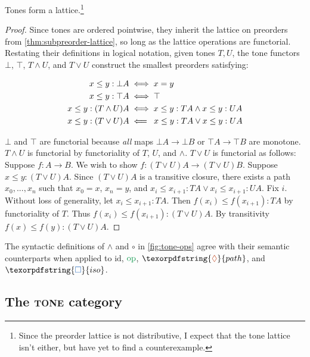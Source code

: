 \documentclass{rntz}
\newcommand{\todo}[1]{{\color{Purple}#1}}
\newcommand{\cat}[1]{\textsc{#1}} %
\newcommand{\Tone}{\cat{tone}}
\newcommand\opcolor{\color{ForestGreen}}
\newcommand\isocolor{\color{NavyBlue}}
\newcommand\pathcolor{\color{Bittersweet}}
\newcommand\id{\ensuremath{\mathrm{id}}}
\newcommand\op{\ensuremath{\mathrm{\opcolor op}}}
\newcommand\iso{\texorpdfstring{\ensuremath{{\isocolor\Box}}}{iso}}
\renewcommand\path{\texorpdfstring{\ensuremath{{\pathcolor\lozenge}}}{path}}
\newcommand\tc{\circ}                      %
\newcommand\tmeet{\wedge}                  %
\begin{document}
\begin{theorem}
  Tones form a lattice.\footnote{Since the preorder lattice is not distributive,
    I expect that the tone lattice isn't either, but have yet to find a
    counterexample.}
\end{theorem}

\begin{proof}
  Since tones are ordered pointwise, they inherit the lattice on preorders from
  \cref{thm:subpreorder-lattice}, so long as the lattice operations
  are functorial. Restating their definitions in logical notation, given tones
  $T,U$, the tone functors $\bot$, $\top$, $T \wedge U$, and $T \vee U$
  construct the smallest preorders satisfying:

  \begin{align*}
    x \le y : \bot A &\iff x = y\\
    x \le y : \top A &\iff \top\\
    x \le y : (T \wedge U)A &\iff x \le y : TA \wedge x \le y : UA\\
    x \le y : (T \vee U)A &\impliedby\hspace{2.5pt} x \le y : TA \vee x \le y : UA
  \end{align*}

  $\bot$ and $\top$ are functorial because \emph{all} maps $\bot A \to \bot B$
  or $\top A \to \top B$ are monotone. $T \wedge U$ is functorial \todo{by
    functoriality of $T$, $U$, and $\wedge$}.
  $T \vee U$ is functorial as follows:
  Suppose $f : A \to B$. We wish to show $f : (T \vee U)A \to (T \vee U)B$.
  Suppose $x \le y : (T \vee U)A$. Since $(T \vee U)A$ is a transitive closure,
  there exists a path $x_0, ..., x_n$ such that $x_0 = x$, $x_n = y$, and $x_i
  \le x_{i+1} : TA \vee x_i \le x_{i+1} : UA$. Fix $i$. Without loss of
  generality, let $x_i \le x_{i+1} : TA$. Then $f(x_i) \le f(x_{i+1}) : TA$ by
  functoriality of $T$. Thus $f(x_i) \le f(x_{i+1}) : (T \vee U)A$. By
  transitivity $f(x) \le f(y) : (T \vee U)A$.
\end{proof}

\begin{conjecture}
  The syntactic definitions of $\tmeet$ and $\tc$ in \cref{fig:tone-ops} agree
  with their semantic counterparts when applied to $\id$, $\op$, $\path$, and
  $\iso$.
\end{conjecture}


\subsection{The \Tone{} category}
\end{document}
